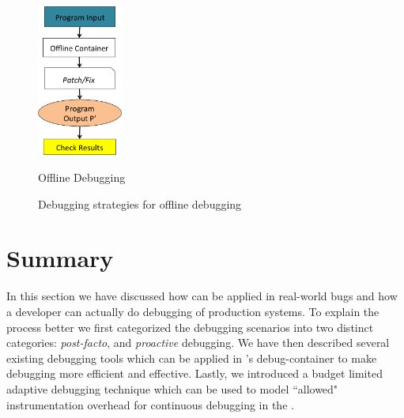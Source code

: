 \begin{figure}[ht]
	\centering
	\includegraphics[width=0.25\textwidth]{guided/figs/offline.png}
	\caption{Offline Debugging}
	\label{fig:offline-debugging}
	\caption{Debugging strategies for offline debugging}
\end{figure}


\section{Summary}
\label{sec:activeSummary}

In this section we have discussed how \parikshan can be applied in real-world bugs and how a developer can actually do debugging of production systems. 
To explain the process better we first categorized the debugging scenarios into two distinct categories: \emph{post-facto}, and \emph{proactive} debugging.
We have then described several existing debugging tools which can be applied in \parikshan's debug-container to make debugging more efficient and effective.
Lastly, we introduced a budget limited adaptive debugging technique which can be used to model ``allowed" instrumentation overhead for continuous debugging in the \debugcontainer.
